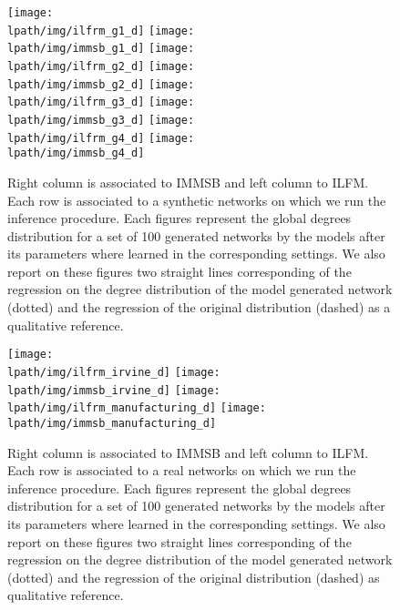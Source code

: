 \begin{figure}[h]
	\centering
	
	\texttt{[image: \\lpath/img/ilfrm\_g1\_d]}
	\endminipage
	\texttt{[image: \\lpath/img/immsb\_g1\_d]}
	\endminipage
	\vspace{-0.4cm}
	\texttt{[image: \\lpath/img/ilfrm\_g2\_d]}
	\endminipage
	\texttt{[image: \\lpath/img/immsb\_g2\_d]}
	\endminipage
	\vspace{-0.4cm}
	\texttt{[image: \\lpath/img/ilfrm\_g3\_d]}
	\endminipage
	\texttt{[image: \\lpath/img/immsb\_g3\_d]}
	\endminipage
	\vspace{-0.4cm}
	\texttt{[image: \\lpath/img/ilfrm\_g4\_d]}
	\endminipage
	\texttt{[image: \\lpath/img/immsb\_g4\_d]}
	\endminipage
	
	\caption{Right column is associated to IMMSB and left column to ILFM. Each row is associated to a synthetic networks on which we run the inference procedure. Each figures represent the global degrees distribution for a set of 100 generated networks by the models after its parameters where learned in the corresponding settings.  We also report on these figures two straight lines corresponding of the regression on the degree distribution of the model generated network (dotted) and the regression of the original distribution (dashed) as a qualitative reference.}
	\label{fig:gen_graph_s}
\end{figure}

\begin{figure}[h]
	\centering
	
	\texttt{[image: \\lpath/img/ilfrm\_irvine\_d]}
	\endminipage
	\texttt{[image: \\lpath/img/immsb\_irvine\_d]}
	\endminipage
	\vspace{-0.4cm}
	\texttt{[image: \\lpath/img/ilfrm\_manufacturing\_d]}
	\endminipage
	\texttt{[image: \\lpath/img/immsb\_manufacturing\_d]}
	\endminipage
	
	\caption{Right column is associated to IMMSB and left column to ILFM. Each row is associated to a real networks on which we run the inference procedure. Each figures represent the global degrees distribution for a set of 100 generated networks by the models after its parameters where learned in the corresponding settings. We also report on these figures two straight lines corresponding of the regression on the degree distribution of the model generated network (dotted) and the regression of the original distribution (dashed) as qualitative reference.}
	\label{fig:gen_graph_r}
\end{figure}


